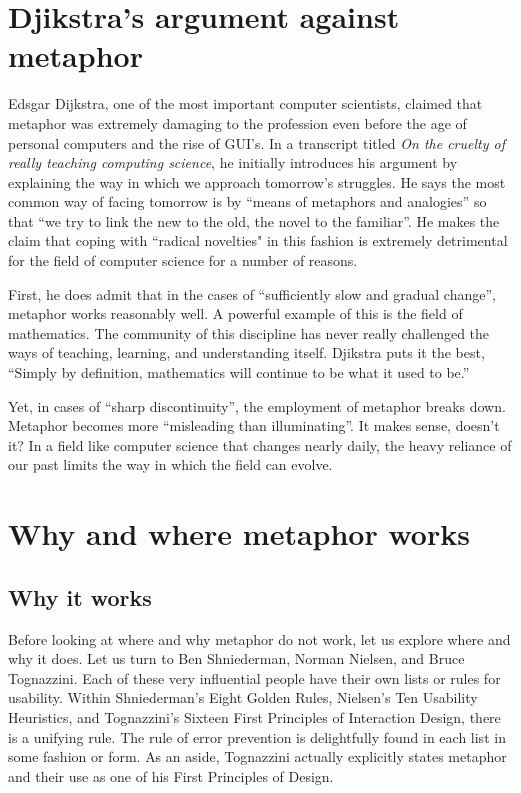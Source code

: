 \documentclass[11pt, oneside]{article}
\begin{document}
\section{Djikstra's argument against metaphor}
Edsgar Dijkstra, one of the most important computer scientists, claimed that metaphor was extremely damaging to the profession even before the age of personal computers and the rise of GUI's. In a transcript titled \textit{On the cruelty of really teaching computing science}, he initially introduces his argument by explaining the way in which we approach tomorrow's struggles. He says the most common way of facing tomorrow is by ``means of metaphors and analogies'' so that ``we try to link the new to the old, the novel to the familiar''. He makes the claim that coping with ``radical novelties" in this fashion is extremely detrimental for the field of computer science for a number of reasons.

First, he does admit that in the cases of ``sufficiently slow and gradual change'', metaphor works reasonably well. A powerful example of this is the field of mathematics. The community of this discipline has never really challenged the ways of teaching, learning, and understanding itself. Djikstra puts it the best, ``Simply by definition, mathematics will continue to be what it used to be.''

Yet, in cases of ``sharp discontinuity'', the employment of metaphor breaks down. Metaphor becomes more ``misleading than illuminating''. It makes sense, doesn't it? In a field like computer science that changes nearly daily, the heavy reliance of our past limits the way in which the field can evolve.
\cite{ewd1036}

\section{Why and where metaphor works}
\subsection{Why it works}
Before looking at where and why metaphor do not work, let us explore where and why it does. Let us turn to Ben Shniederman, Norman Nielsen, and Bruce Tognazzini. Each of these very influential people have their own lists or rules for usability. Within Shniederman's Eight Golden Rules, Nielsen's Ten Usability Heuristics, and Tognazzini's Sixteen First Principles of Interaction Design, there is a unifying rule. The rule of error prevention is delightfully found in each list in some fashion or form. \cite{shniederman-golden-rules} \cite{tognazzini-first-principles} \cite{nielsen-usability-heuristics} As an aside, Tognazzini actually explicitly states metaphor and their use as one of his First Principles of Design.
\end{document}
